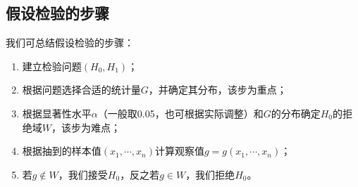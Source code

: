 \subsection{假设检验的步骤}

我们可总结假设检验的步骤：
\begin{enumerate}
    \item 建立检验问题$\left( H_0,H_1 \right) $；
    \item 根据问题选择合适的统计量$G$，并确定其分布，该步为重点；
    \item 根据显著性水平$\alpha $（一般取0.05，也可根据实际调整）和$G$的分布确定$H_0$的拒绝域$W$，该步为难点；
    \item 根据抽到的样本值$\left( x_1,\cdots ,x_n \right) $计算观察值$g=g\left( x_1,\cdots ,x_n \right) $；
    \item 若$g\notin W$，我们接受$H_0$，反之若$g\in W$，我们拒绝$H_0$。
\end{enumerate}




